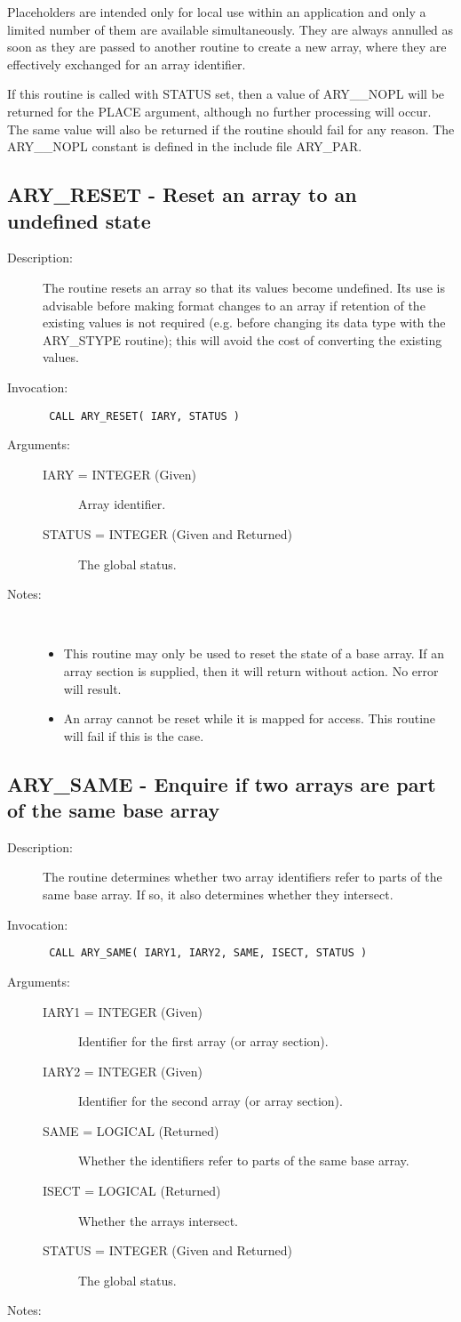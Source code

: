 \documentclass[twoside,11pt]{article}
\newcommand{\xlabel}[1]{}
\newlength{\sstbannerlength}
\newlength{\sstcaptionlength}
\newlength{\sstexampleslength}
\newlength{\sstexampleswidth}
\newcommand{\sstroutine}[3]{
   \goodbreak
   \rule{\textwidth}{0.5mm}
   \vspace{-7ex}
   \newline
   \settowidth{\sstbannerlength}{{\Large {\bf #1}}}
   \setlength{\sstcaptionlength}{\textwidth}
   \setlength{\sstexampleslength}{\textwidth}
   \addtolength{\sstbannerlength}{0.5em}
   \addtolength{\sstcaptionlength}{-2.0\sstbannerlength}
   \addtolength{\sstcaptionlength}{-5.0pt}
   \settowidth{\sstexampleswidth}{{\bf Examples:}}
   \addtolength{\sstexampleslength}{-\sstexampleswidth}
   \parbox[t]{\sstbannerlength}{\flushleft{\Large {\bf #1}}}
   \parbox[t]{\sstcaptionlength}{\center{\Large #2}}
   \parbox[t]{\sstbannerlength}{\flushright{\Large {\bf #1}}}
   \begin{description}
      #3
   \end{description}
}
\newcommand{\sstdescription}[1]{\item[Description:] #1}
\newcommand{\sstinvocation}[1]{\item[Invocation:]\hspace{0.4em}{\tt #1}}
\newcommand{\sstarguments}[1]{
   \item[Arguments:] \mbox{} \\
   \vspace{-3.5ex}
   \begin{description}
      #1
   \end{description}
}
\newcommand{\sstsubsection}[1]{ \item[{#1}] \mbox{} \\}
\newcommand{\sstnotes}[1]{\item[Notes:] \mbox{} \\[1.3ex] #1}
\newcommand{\sstitemlist}[1]{
  \mbox{} \\
  \vspace{-3.5ex}
  \begin{itemize}
     #1
  \end{itemize}
}
\newcommand{\sstitem}{\item}
\newcommand{\ssttt}{\tt}
\renewcommand{\sstroutine}[3]{
      \subsection{#1\xlabel{#1}-\label{#1}#2}
      \begin{description}
         #3
      \end{description}
   }
\renewcommand{\sstdescription}[1]{\item[Description:]
      \begin{description}
         #1
      \end{description}
   }
\renewcommand{\sstinvocation}[1]{\item[Invocation:]
      \begin{description}
         {\ssttt #1}
      \end{description}
   }
\renewcommand{\sstarguments}[1]{
      \item[Arguments:]
      \begin{description}
         #1
      \end{description}
   }
\renewcommand{\sstsubsection}[1]{\item[{#1}]}
\renewcommand{\sstnotes}[1]{\item[Notes:]
      \begin{description}
         #1
      \end{description}
   }
\newcommand{\sstitemlist}[1]{
      \begin{itemize}
         #1
      \end{itemize}
   }
\begin{document}
\begin{eqn*}
{{{         \sstitem
         Placeholders are intended only for local use within an
         application and only a limited number of them are available
         simultaneously. They are always annulled as soon as they are
         passed to another routine to create a new array, where they are
         effectively exchanged for an array identifier.

         \sstitem
         If this routine is called with STATUS set, then a value of
         ARY\_\_NOPL will be returned for the PLACE argument, although no
         further processing will occur. The same value will also be
         returned if the routine should fail for any reason. The ARY\_\_NOPL
         constant is defined in the include file ARY\_PAR.
      }
   }
}
\sstroutine{
   ARY\_RESET
}{
   Reset an array to an undefined state
}{
   \sstdescription{
      The routine resets an array so that its values become undefined.
      Its use is advisable before making format changes to an array if
      retention of the existing values is not required (e.g. before
      changing its data type with the ARY\_STYPE routine); this will
      avoid the cost of converting the existing values.
   }
   \sstinvocation{
      CALL ARY\_RESET( IARY, STATUS )
   }
   \sstarguments{
      \sstsubsection{
         IARY = INTEGER (Given)
      }{
         Array identifier.
      }
      \sstsubsection{
         STATUS = INTEGER (Given and Returned)
      }{
         The global status.
      }
   }
   \sstnotes{
      \sstitemlist{

         \sstitem
         This routine may only be used to reset the state of a base
         array. If an array section is supplied, then it will return
         without action. No error will result.

         \sstitem
         An array cannot be reset while it is mapped for access. This
         routine will fail if this is the case.
      }
   }
}
\sstroutine{
   ARY\_SAME
}{
   Enquire if two arrays are part of the same base array
}{
   \sstdescription{
      The routine determines whether two array identifiers refer to
      parts of the same base array.  If so, it also determines whether
      they intersect.
   }
   \sstinvocation{
      CALL ARY\_SAME( IARY1, IARY2, SAME, ISECT, STATUS )
   }
   \sstarguments{
      \sstsubsection{
         IARY1 = INTEGER (Given)
      }{
         Identifier for the first array (or array section).
      }
      \sstsubsection{
         IARY2 = INTEGER (Given)
      }{
         Identifier for the second array (or array section).
      }
      \sstsubsection{
         SAME = LOGICAL (Returned)
      }{
         Whether the identifiers refer to parts of the same base array.
      }
      \sstsubsection{
         ISECT = LOGICAL (Returned)
      }{
         Whether the arrays intersect.
      }
      \sstsubsection{
         STATUS = INTEGER (Given and Returned)
      }{
         The global status.
      }
   }
   \sstnotes{
      \sstitemlist{

}}}
\end{eqn*}
\end{document}
